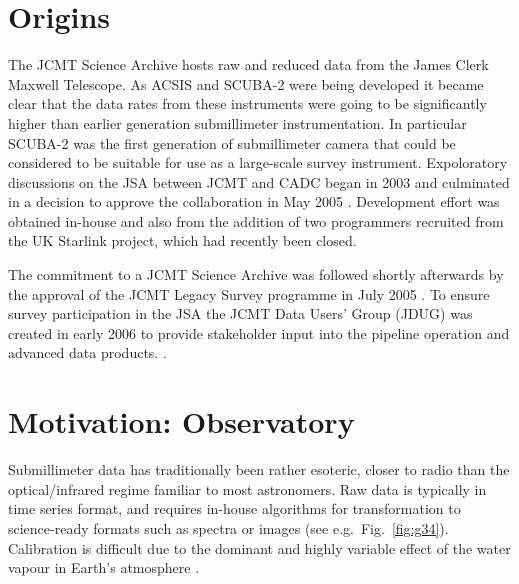 \documentclass[final,authoryear,5p,times,twocolumn]{elsarticle}
\begin{document}

\newcommand{\mnras}{MNRAS}
\newcommand{\aap}{A\&A}
\newcommand{\aaps}{A\&AS}
\newcommand{\pasp}{PASP}
\newcommand{\apj}{ApJ}
\newcommand{\apjs}{ApJS}
\newcommand{\qjras}{QJRAS}
\newcommand{\an}{Astron.\ Nach.}
\newcommand{\ijimw}{Int.\ J.\ Infrared \& Millimeter Waves}
\newcommand{\procspie}{Proc.\ SPIE}
\newcommand{\aspconf}{ASP Conf. Ser.}



\newcommand{\ascl}[1]{\href{http://www.ascl.net/#1}{ascl:#1}}


\section{Origins}

The JCMT Science Archive
\citep[JSA;][]{2008SPIE.7016E..16G,2008ASPC..394..450E,2008ASPC..394..135G,2011ASPC..442..203E}
hosts raw and reduced data from the James Clerk Maxwell Telescope. As
ACSIS \citep{2000ASPC..217...33D} and SCUBA-2
\citep{2003SPIE.4855....1H} were being developed it became clear that
the data rates from these instruments were going to be significantly
higher than earlier generation submillimeter instrumentation. In
particular SCUBA-2 was the first generation of submillimeter camera
that could be considered to be suitable for use as a large-scale
survey instrument. Expoloratory discussions on the JSA between JCMT and CADC
began in 2003 and culminated in a decision to approve the
collaboration in May 2005 \citep{2005JCMTN23}. Development effort was
obtained in-house and also from the addition of two programmers recruited from
the UK Starlink project, which had recently been closed.

The commitment to a JCMT Science Archive was followed shortly
afterwards by the approval of the JCMT Legacy Survey programme in July
2005 \citep{2005JCMTN23}. To ensure survey participation in the JSA
the JCMT Data Users' Group (JDUG) was created in early 2006 to provide
stakeholder input into the pipeline operation and advanced data
products. \citep{2006JCMTN24R}.

\section{Motivation: Observatory}

Submillimeter data has traditionally been rather esoteric, closer to
radio than the optical/infrared regime familiar to most
astronomers. Raw data is typically in time series format, and requires
in-house algorithms for transformation to science-ready formats such
as spectra or images (see e.g.\ Fig.~\ref{fig:g34}). Calibration is
difficult due to the dominant and highly variable effect of the water
vapour in Earth's atmosphere
\citep[e.g.,][]{2002MNRAS.336....1A,2013MNRAS.430.2534D}.
\end{document}
